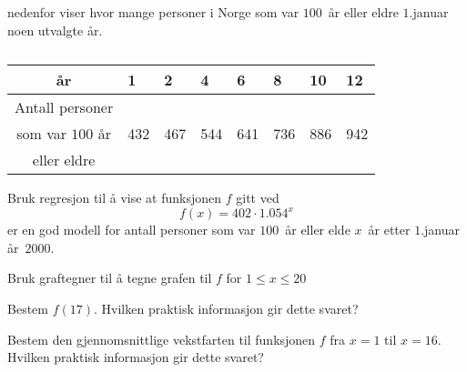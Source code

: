 \Oppgave[9]

 nedenfor viser
hvor mange personer i Norge som var $100$~år eller eldre $1$.januar noen
utvalgte år.

\begin{table}[H]
    \caption{}
    \label{tab:Forkurs-1p-2p-laererutdanning-2017-V-U-oppgave-2-5}
    \begin{tabularx}{\textwidth}{|c| *{7}{Y|}} \hline \Rowcolor
        år               &     1     &     2     &     4     &     6     &     8     &     10    &     12    \\ \hline
        Antall personer & & & & & & & \\
        som var $100$ år & \num{432} & \num{467} & \num{544} & \num{641} &
        \num{736} & \num{886} & \num{942} \\
        eller eldre  & & & & & & & \\ \hline
    \end{tabularx}
\end{table}

\begin{oppgaver}
   Bruk regresjon til å vise at funksjonen $f$ gitt ved
  \begin{equation*}
    f(x) = 402 \cdot \num{1.054}^x
  \end{equation*}
  er en god modell for antall personer som var $100$~år eller elde $x$~år etter
  $1$.januar år~$2000$.
\end{oppgaver}

\begin{oppgaver}
     Bruk graftegner til å tegne grafen til $f$ for $1 \leq x \leq 20$
\end{oppgaver}

\begin{oppgaver}
     Bestem $f(17)$. Hvilken praktisk informasjon gir dette svaret?
\end{oppgaver}

\begin{oppgaver}
     Bestem den gjennomsnittlige vekstfarten til funksjonen $f$ fra
    $x=1$ til $x=16$. Hvilken praktisk informasjon gir dette svaret?
\end{oppgaver}

